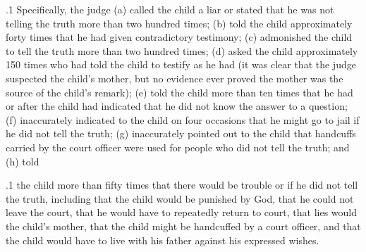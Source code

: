 \documentclass[11pt, twoside]{article}
\begin{document}
{\p.1{%
Specifically, the judge (a) called the child a liar or stated that he was
not telling the truth more than two hundred times; (b) told the child
approximately forty times that he had given contradictory testimony;
(c) admonished the child to tell the truth more than two hundred times;
(d) asked the child approximately 150 times who had told the child to
testify as he had (it was clear that the judge suspected the child’s mother,
but no evidence ever proved the mother was the source of the child’s
remark); (e) told the child more than ten times that he had  or  after the child had indicated that he did
not know the answer to a question; (f) inaccurately indicated to the child
on four occasions that he might go to jail if he did not tell the truth;
(g) inaccurately pointed out to the child that handcuffs carried by the
court officer were used for people who did not tell the truth; and (h) told
}%

\p.1{%
the child more than fifty times that there would be  trouble or
 if he did not tell the truth, including that the
child would be punished by God, that he could not leave the court, that
he would have to repeatedly return to court, that lies would  the
child’s mother, that the child might be handcuffed by a court officer, and
that the child would have to live with his father against his expressed
wishes.
}%

}
\end{document}
